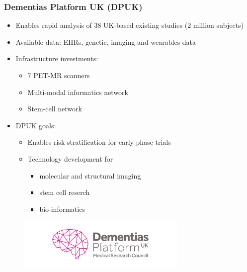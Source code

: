 \documentclass[10pt,xcolor=table]{beamer}
\begin{document}
\begin{frame}
\frametitle{Dementias Platform UK (DPUK)}

\begin{itemize}
\item Enables rapid analysis of 38 UK-based existing studies (2 million subjects)
\item Available data: EHRs, genetic, imaging and wearables data
\item Infrastructure investments:
\begin{itemize}
 \item 7 PET-MR scanners
 \item Multi-modal informatics network
 \item Stem-cell network
\end{itemize}
\item DPUK goals:
\begin{itemize}
 \item Enables risk stratification for early phase trials
 \item Technology development for 
 \begin{itemize}
 \item molecular and structural imaging
 \item stem cell reserch 
 \item bio-informatics
\end{itemize}

\end{itemize}


\end{itemize}


\vspace{-1em}
\begin{figure}
\centering
\includegraphics[height=2.5cm,right]{DPUK_logo}   
\end{figure}
\vspace{-4em}

\end{frame}
\end{document}
